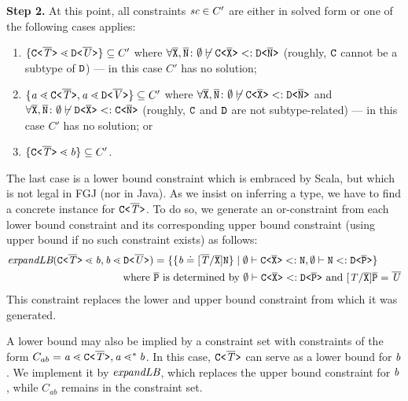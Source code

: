 \textbf{Step 2.} At this point, all
constraints $ \textit{sc} \in C'$ are either in solved form or one of the following
cases applies:
\begin{enumerate}
\item $\{ \mathtt{C \texttt{<} \overline{\mathit{T}} \texttt{>} } \lessdot \mathtt{D \texttt{<} \overline{\mathit{U}} \texttt{>} } \}
  \subseteq C'$ where $\forall\overline{\tt X},\overline{\tt N}\colon \emptyset \not\vdash \mathtt{C \texttt{<} \overline{\tt X} \texttt{>} } <:
  \mathtt{D \texttt{<} \overline{\tt N} \texttt{>} }$ (roughly, ${\tt C}$ cannot be a subtype of ${\tt D}$) --- in this case $C'$ has no solution;
\item $\{ \mathit{ a } \lessdot \mathtt{C \texttt{<} \overline{\mathit{T}} \texttt{>} }, \mathit{ a } \lessdot
    \mathtt{D \texttt{<} \overline{\mathit{V}} \texttt{>} } \} \subseteq C'$ where
  $\forall\overline{\tt X},\overline{\tt N}\colon \emptyset \not\vdash \mathtt{C \texttt{<} \overline{\tt X} \texttt{>} } <:
  \mathtt{D \texttt{<} \overline{\tt N} \texttt{>} } $ and $\forall\overline{\tt X},\overline{\tt N}\colon \emptyset \not\vdash \mathtt{D \texttt{<} \overline{\tt X} \texttt{>} } <:
  \mathtt{C \texttt{<} \overline{\tt N} \texttt{>} }$ (roughly, ${\tt C}$ and ${\tt D}$ are not
  subtype-related) --- in this case $C'$ has no solution; or
\item $\{ \mathtt{C \texttt{<} \overline{\mathit{T}} \texttt{>} } \lessdot \mathit{ b } \} \subseteq C'$.
\end{enumerate}
The last case is a lower bound constraint which is embraced by Scala,
but which is not legal in FGJ (nor in Java). As we insist on inferring
a type, we have to find a concrete instance for
$\mathtt{C \texttt{<} \overline{\mathit{T}} \texttt{>} }$. To do so, we generate an or-constraint from
each lower bound constraint and its corresponding upper bound constraint (using upper bound  if no such constraint exists) as follows:
\begin{align*}
  \textit{expandLB} (\mathtt{C \texttt{<} \overline{\mathit{T}} \texttt{>} } \lessdot \mathit{ b }, \mathit{ b } \lessdot \mathtt{D \texttt{<} \overline{\mathit{U}} \texttt{>} })
  & = \{  \{  \mathit{ b } \doteq [\overline{\mathit{T}}/\overline{\tt X}]\texttt{N}  \} \mid
    \emptyset \vdash \mathtt{C \texttt{<} \overline{\texttt{X}} \texttt{>} } <: \texttt{N},
    \emptyset \vdash \texttt{N} <:  \mathtt{D \texttt{<} \overline{P} \texttt{>} } \}
  \\ \text{where }&\overline{\tt P}\text{ is determined by }\emptyset \vdash \mathtt{C \texttt{<} \overline{\texttt{X}} \texttt{>} } <: \mathtt{D \texttt{<} \overline{\tt P} \texttt{>} } \text{ and
  } [\mathit{T}/\overline{\tt X}]\overline{\tt P} = \overline{\mathit{U}}
\end{align*}
This constraint replaces the lower and upper bound constraint from which it was generated.

A lower bound may also be implied by a constraint set with constraints of the form
$C_{ab} = \mathit{ a } \lessdot \mathtt{C \texttt{<} \overline{\mathit{T}} \texttt{>} }, \mathit{ a } \lessdot^* \mathit{ b }$. In this case, $\mathtt{C \texttt{<} \overline{\mathit{T}} \texttt{>} } $ can serve as a lower bound for
$\mathit{ b }$. We implement it by $\textit{expandLB}$, which replaces the upper bound constraint for $\mathit{ b }$, while $C_{ab}$ remains in the constraint
set.

